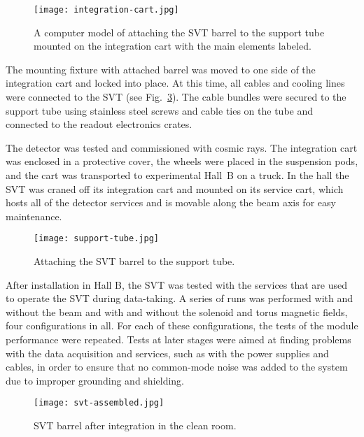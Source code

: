 \begin{figure}[h] 
\centering 
\texttt{[image: integration-cart.jpg]}
\caption{A computer model of attaching the SVT barrel to the support tube mounted on the integration cart
  with the main elements labeled.}
\label{fig:integration-cart}
\end{figure}

The mounting fixture with attached barrel was moved to one side of the integration cart and locked into place. At
this time, all cables and cooling lines were connected to the SVT (see Fig.~\ref{fig:svt-assembled}). The cable
bundles were secured to the support tube using stainless steel screws and cable ties on the tube and connected to
the readout electronics crates. 

The detector was tested and commissioned with cosmic rays. The integration cart was enclosed in a protective
cover, the wheels were placed in the suspension pods, and the cart was transported to experimental Hall~B on a
truck. In the hall the SVT was craned off its integration cart and mounted on its service cart, which hosts all of
the detector services and is movable along the beam axis for easy maintenance.

\begin{figure}[h] 
\centering 
\texttt{[image: support-tube.jpg]}
\caption{Attaching the SVT barrel to the support tube.}
\label{fig:support-tube}
\end{figure}

After installation in Hall B, the SVT was tested with the services that are used to operate the SVT during
data-taking. A series of runs was performed with and without the beam and with and without the solenoid and torus
magnetic fields, four configurations in all. For each of these configurations, the tests of the module performance
were repeated. Tests at later stages were aimed at finding problems with the data acquisition and services, such
as with the power supplies and cables, in order to ensure that no common-mode noise was added to the system due
to improper grounding and shielding. 

\begin{figure}[h] 
\centering 
\texttt{[image: svt-assembled.jpg]}
\caption{SVT barrel after integration in the clean room.}
\label{fig:svt-assembled}
\end{figure}
